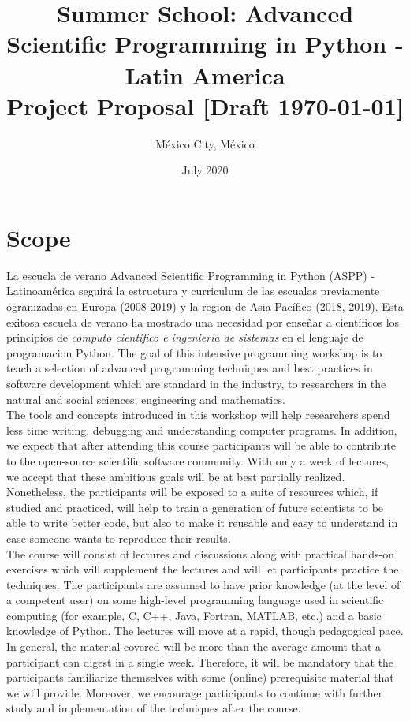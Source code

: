 \documentclass{article}[11pt]
\title{%
Summer School: Advanced Scientific Programming in Python - Latin America 
\\ \vspace{0.2cm}
\large Project Proposal [Draft \today]}
\date{July 2020}
\author{M\'exico City, M\'exico}
\begin{document}
\maketitle

\begin{center}
\end{center}

\section*{Scope}
La escuela de verano Advanced Scientific Programming in Python (ASPP) - Latinoamérica seguirá la estructura y curriculum de las escualas previamente ogranizadas en Europa (2008-2019) y la region de Asia-Pacífico (2018, 2019).
Esta exitosa escuela de verano ha mostrado una necesidad por enseñar a científicos los principios de \emph{computo científico e ingenieria de sistemas} en el lenguaje de programacion Python. 
The goal of this intensive programming workshop is to teach a selection of advanced programming techniques and best practices in  software development which are standard in the industry, to researchers in the natural and social sciences, engineering and mathematics.\\

The tools and concepts introduced in this workshop will help researchers spend less time writing, debugging and understanding computer programs. 
In addition, we expect that after attending this course participants will be able to contribute to the open-source scientific software community. 
With only a week of lectures, we accept that these ambitious goals will be at best partially realized. 
Nonetheless, the participants will be exposed to a suite of resources which, if studied and practiced, will help to train a generation of future scientists to be able to write better code, but also to make it reusable and easy to understand in case someone wants to reproduce their results.\\

The course will  consist of lectures and discussions along with practical hands-on exercises which will supplement the lectures and will let participants practice the techniques. The participants are assumed to have prior knowledge (at the level of a competent user) on some high-level programming language used in scientific computing (for example, C, C++, Java, Fortran, MATLAB, etc.) and a basic knowledge of Python. 
The lectures will move at a rapid, though pedagogical pace. 
In general, the material covered will be more than the average amount that a participant can digest in a single week. 
Therefore, it will be mandatory that the participants familiarize themselves with some (online) prerequisite  material that we will provide. 
Moreover, we encourage participants to continue with further study and implementation of the techniques after the course.\\
\end{document}
